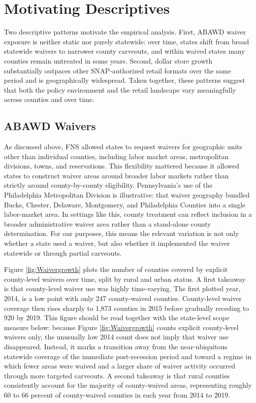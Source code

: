 \section{Motivating Descriptives}

Two descriptive patterns motivate the empirical analysis. First, ABAWD waiver exposure is neither static nor purely statewide: over time, states shift from broad statewide waivers to narrower county carveouts, and within waived states many counties remain untreated in some years. Second, dollar store growth substantially outpaces other SNAP-authorized retail formats over the same period and is geographically widespread. Taken together, these patterns suggest that both the policy environment and the retail landscape vary meaningfully across counties and over time.

\subsection{ABAWD Waivers}

As discussed above, FNS allowed states to request waivers for geographic units other than individual counties, including labor market areas, metropolitan divisions, towns, and reservations. This flexibility mattered because it allowed states to construct waiver areas around broader labor markets rather than strictly around county-by-county eligibility. Pennsylvania's use of the Philadelphia Metropolitan Division is illustrative: that waiver geography bundled Bucks, Chester, Delaware, Montgomery, and Philadelphia Counties into a single labor-market area. In settings like this, county treatment can reflect inclusion in a broader administrative waiver area rather than a stand-alone county determination. For our purposes, this means the relevant variation is not only whether a state used a waiver, but also whether it implemented the waiver statewide or through partial carveouts.

Figure \ref{fig:Waivergrowth} plots the number of counties covered by explicit county-level waivers over time, split by rural and urban status. A first takeaway is that county-level waiver use was highly time-varying. The first plotted year, 2014, is a low point with only 247 county-waived counties. County-level waiver coverage then rises sharply to 1,873 counties in 2015 before gradually receding to 920 by 2019. This figure should be read together with the state-level scope measure below: because Figure \ref{fig:Waivergrowth} counts explicit county-level waivers only, the unusually low 2014 count does not imply that waiver use disappeared. Instead, it marks a transition away from the near-ubiquitous statewide coverage of the immediate post-recession period and toward a regime in which fewer areas were waived and a larger share of waiver activity occurred through more targeted carveouts. A second takeaway is that rural counties consistently account for the majority of county-waived areas, representing roughly 60 to 66 percent of county-waived counties in each year from 2014 to 2019.

